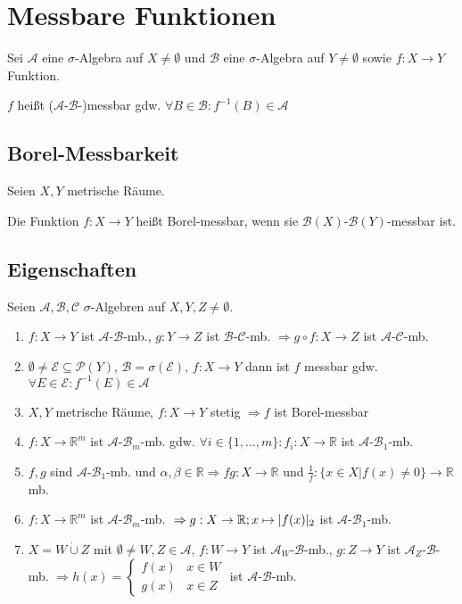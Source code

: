 \section*{Messbare Funktionen}

Sei $\mathcal{A}$ eine $\sigma$-Algebra auf $X\neq \emptyset$ und $\mathcal{B}$ eine $\sigma$-Algebra auf $Y\neq \emptyset$ sowie $f : X \rightarrow Y$ Funktion.

$f$ heißt ($\mathcal{A}$-$\mathcal{B}$-)messbar gdw. $\forall B \in \mathcal{B} : f^{-1}(B) \in \mathcal{A}$

\subsection*{Borel-Messbarkeit}

Seien $X, Y$ metrische Räume.

Die Funktion $f : X \rightarrow Y$ heißt Borel-messbar, wenn sie $\mathcal{B}(X)$-$\mathcal{B}(Y)$-messbar ist.

\subsection*{Eigenschaften}

Seien $\mathcal{A}, \mathcal{B}, \mathcal{C}$ $\sigma$-Algebren auf $X, Y, Z \neq \emptyset$.

\begin{enumerate}[label=(\alph*)]
	\item $f : X \rightarrow Y$ ist $\mathcal{A}$-$\mathcal{B}$-mb., $g : Y \rightarrow Z$ ist $\mathcal{B}$-$\mathcal{C}$-mb. $\Rightarrow g \circ f : X \rightarrow Z$ ist $\mathcal{A}$-$\mathcal{C}$-mb.
	\item $\emptyset \neq \mathcal{E} \subseteq \mathcal{P}(Y)$, $\mathcal{B} = \sigma(\mathcal{E})$, $f: X \rightarrow Y$ dann ist $f$ messbar gdw. $\forall E \in \mathcal{E} : f^{-1}(E) \in \mathcal{A}$
	\item $X, Y$ metrische Räume, $f : X \rightarrow Y$ stetig $\Rightarrow f$ ist Borel-messbar
	\item $f : X \rightarrow \mathbb{R}^m$ ist $\mathcal{A}$-$\mathcal{B}_m$-mb. gdw. $\forall i \in \{1, \dots, m\} : f_i : X \rightarrow \mathbb{R}$ ist $\mathcal{A}$-$\mathcal{B}_1$-mb.
	\item $f, g$ sind $\mathcal{A}$-$\mathcal{B}_1$-mb. und $\alpha, \beta \in \mathbb{R} \Rightarrow fg : X \rightarrow \mathbb{R}$ und $\frac{1}{f} : \{x \in X | f(x) \neq 0\} \rightarrow \mathbb{R}$ mb.
	\item $f : X \rightarrow \mathbb{R}^m$ ist $\mathcal{A}$-$\mathcal{B}_m$-mb. $\\\Rightarrow g : X \rightarrow \mathbb{R}; x \mapsto |f(x)|_2$ ist $\mathcal{A}$-$\mathcal{B}_1$-mb.
	\item $X = W \dot\cup Z$ mit $\emptyset \neq W, Z \in \mathcal{A}$, $f : W \rightarrow Y$ ist $\mathcal{A}_W$-$\mathcal{B}$-mb., $g : Z \rightarrow Y$ ist $\mathcal{A}_Z$-$\mathcal{B}$-mb. $\Rightarrow h(x) = \begin{cases}
	f(x) & x \in W \\
	g(x) & x \in Z 
\end{cases}$ ist $\mathcal{A}$-$\mathcal{B}$-mb.
\end{enumerate}

